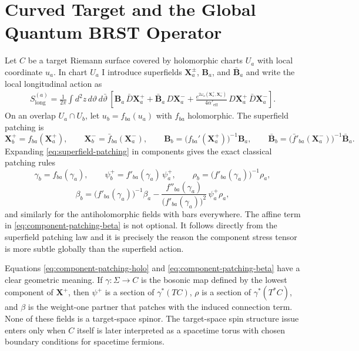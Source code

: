 \documentclass[11pt]{article}
\newcommand{\Aeff}{\alpha'_{\mathrm{eff}}}
\begin{document}
\section{Curved Target and the Global Quantum BRST Operator}
Let $C$ be a target Riemann surface covered by holomorphic charts $U_a$ with local coordinate $u_a$. In chart $U_a$ I introduce superfields $\mathbf X_a^\pm$, $\mathbf B_a$, and $\bar{\mathbf B}_a$ and write the local longitudinal action as
\begin{equation}\label{eq:curved-local-action}
\begin{aligned}
S_{\mathrm{long}}^{(a)}
=
\frac{1}{2\pi}\int d^2z\,d\vartheta\,d\bar\vartheta\,
\left[
\mathbf B_a\,\bar D\mathbf X_a^+
+\bar{\mathbf B}_a\,D\mathbf X_a^-
+\frac{e^{2\omega_a(\mathbf X_a^+,\mathbf X_a^-)}}{4\Aeff}\,
D\mathbf X_a^+\,\bar D\mathbf X_a^-
\right].
\end{aligned}
\end{equation}
On an overlap $U_a\cap U_b$, let $u_b=f_{ba}(u_a)$ with $f_{ba}$ holomorphic. The superfield patching is
\begin{equation}\label{eq:superfield-patching}
\mathbf X_b^+=f_{ba}(\mathbf X_a^+),
\qquad
\mathbf X_b^-=\bar f_{ba}(\mathbf X_a^-),
\qquad
\mathbf B_b=\bigl(f_{ba}'(\mathbf X_a^+)\bigr)^{-1}\mathbf B_a,
\qquad
\bar{\mathbf B}_b=\bigl(\bar f'_{ba}(\mathbf X_a^-)\bigr)^{-1}\bar{\mathbf B}_a.
\end{equation}
Expanding \eqref{eq:superfield-patching} in components gives the exact classical patching rules
\begin{equation}\label{eq:component-patching-holo}
\gamma_b=f_{ba}(\gamma_a),
\qquad
\psi_b^+=f'_{ba}(\gamma_a)\,\psi_a^+,
\qquad
\rho_b=\bigl(f'_{ba}(\gamma_a)\bigr)^{-1}\rho_a,
\end{equation}
\begin{equation}\label{eq:component-patching-beta}
\beta_b
=
\bigl(f'_{ba}(\gamma_a)\bigr)^{-1}\beta_a
-\frac{f''_{ba}(\gamma_a)}{\bigl(f'_{ba}(\gamma_a)\bigr)^2}\,
\psi_a^+\rho_a,
\end{equation}
and similarly for the antiholomorphic fields with bars everywhere. The affine term in \eqref{eq:component-patching-beta} is not optional. It follows directly from the superfield patching law and it is precisely the reason the component stress tensor is more subtle globally than the superfield action.

Equations \eqref{eq:component-patching-holo} and \eqref{eq:component-patching-beta} have a clear geometric meaning. If $\gamma:\Sigma\to C$ is the bosonic map defined by the lowest component of $\mathbf X^+$, then $\psi^+$ is a section of $\gamma^*(TC)$, $\rho$ is a section of $\gamma^*(T^*C)$, and $\beta$ is the weight-one partner that patches with the induced connection term. None of these fields is a target-space spinor. The target-space spin structure issue enters only when $C$ itself is later interpreted as a spacetime torus with chosen boundary conditions for spacetime fermions.
\end{document}
